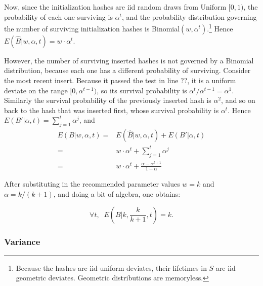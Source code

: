 \documentclass{sig-alternate}
\begin{document}


Now, since the initialization hashes are iid random draws from Uniform
$[0,1)$, the probability of each one surviving is $\alpha^t$, and the
  probability distribution governing the number of surviving
  initialization hashes is Binomial$(w,\alpha^t)$.\footnote{Because
  the hashes are iid uniform deviates, their lifetimes in $S$ are iid geometric deviates. 
  Geometric distributions are memoryless.}
  Hence $E(\hat{B}|w,\alpha,t) = w \cdot \alpha^t$.

However, the number of surviving inserted hashes is not governed by a Binomial distribution, 
because each one has a different probability of surviving.
Consider the most recent insert. Because it passed the test in line ??, it is a uniform deviate
on the range $[0,\alpha^{t-1})$, so its survival probability is
$\alpha^t/\alpha^{t-1} = \alpha^1$. Similarly the survival probability of the previously inserted hash is
$\alpha^2$, and so on back to the hash that was inserted first, 
whose survival probability is $\alpha^t$. 
Hence $E(B'|\alpha,t) = \sum_{j=1}^{t} \alpha^j$, and 
\begin{align}
E(B|w,\alpha,t) = & E(\hat{B}|w,\alpha,t) + E(B'|\alpha,t) \\
                = & w \cdot \alpha^t + \sum_{j=1}^{t} \alpha^j \\
                = & w \cdot \alpha^t + \frac{\alpha - \alpha^{t+1}}{1 - \alpha}
\end{align}

\noindent After substituting in the recommended parameter values $w=k$ and $\alpha=k/(k+1)$, and doing a bit of algebra,
one obtains:

\begin{equation}
\forall t, \;\; E(B|k,\frac{k}{k+1},t) = k.
\end{equation}

\subsubsection{Variance}
\end{document}
